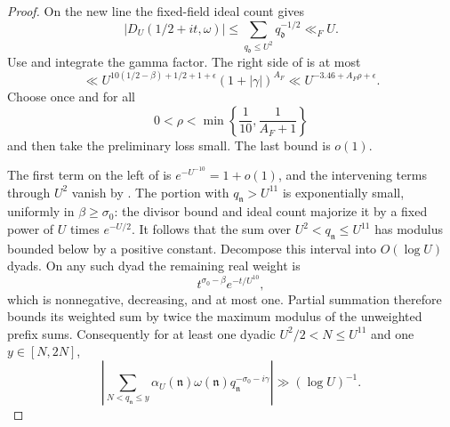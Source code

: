 \begin{proof}
On the new line the fixed-field ideal count gives
\[
 |D_U(1/2+it,\omega)|
       \le\sum_{q_{\mathfrak d}\le U^2}q_{\mathfrak d}^{-1/2}
       \ll_F U.
\]
Use  and integrate the gamma
factor.  The right side of  is at most
\begin{equation}
 \ll U^{10(1/2-\beta)+1/2+1+\epsilon}(1+|\gamma|)^{A_F}
 \ll U^{-3.46+A_F\rho+\epsilon}.
\label{eq:detector-shift-bound}
\end{equation}
Choose once and for all
\[
 0<\rho<\min\left\{\frac1{10},\frac1{A_F+1}\right\}
\]
and then take the preliminary loss small.  The last bound is \(o(1)\).

The first term on the left of  is
\(e^{-U^{-10}}=1+o(1)\), and the intervening terms through \(U^2\)
vanish by .  The portion with
\(q_{\mathfrak n}>U^{11}\) is exponentially small, uniformly in
\(\beta\ge\sigma_0\): the divisor bound and ideal count majorize it by
a fixed power of \(U\) times \(e^{-U/2}\).  It follows that the sum
over \(U^2<q_{\mathfrak n}\le U^{11}\) has modulus bounded below by a
positive constant.  Decompose this interval into \(O(\log U)\) dyads.
On any such dyad the remaining real weight is
\[
 t^{\sigma_0-\beta}e^{-t/U^{10}},
\]
which is nonnegative, decreasing, and at most one.  Partial summation
therefore bounds its weighted sum by twice the maximum modulus of the
unweighted prefix sums.  Consequently for at least one dyadic
\(U^2/2<N\le U^{11}\) and one \(y\in[N,2N]\),
\begin{equation}
 \left|\sum_{N<q_{\mathfrak n}\le y}
      \alpha_U(\mathfrak n)\omega(\mathfrak n)
      q_{\mathfrak n}^{-\sigma_0-i\gamma}\right|
       \gg(\log U)^{-1}.
\label{eq:detecting-partial-sum}
\end{equation}


\end{proof}

